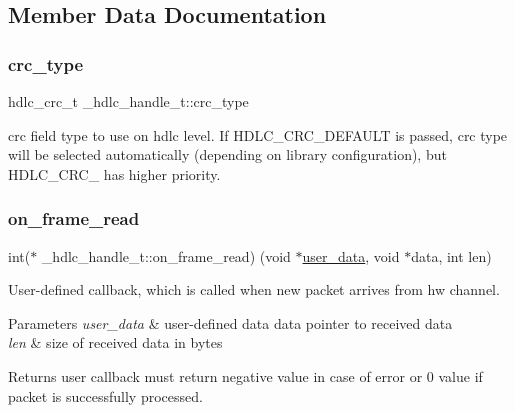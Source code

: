 \subsection{Member Data Documentation}
\mbox{\label{struct__hdlc__handle__t_a156f67a5da24e537a8c0dcda28b59668}} 
\subsubsection{\texorpdfstring{crc\+\_\+type}{crc\_type}}
{\footnotesize\ttfamily hdlc\+\_\+crc\+\_\+t \+\_\+hdlc\+\_\+handle\+\_\+t\+::crc\+\_\+type}

crc field type to use on hdlc level. If H\+D\+L\+C\+\_\+\+C\+R\+C\+\_\+\+D\+E\+F\+A\+U\+LT is passed, crc type will be selected automatically (depending on library configuration), but H\+D\+L\+C\+\_\+\+C\+R\+C\+\_ has higher priority. \mbox{\label{struct__hdlc__handle__t_a751872adfef39b5b1325fa8826bae689}} 
\subsubsection{\texorpdfstring{on\+\_\+frame\+\_\+read}{on\_frame\_read}}
{\footnotesize\ttfamily int($\ast$ \+\_\+hdlc\+\_\+handle\+\_\+t\+::on\+\_\+frame\+\_\+read) (void $\ast$\hyperlink{struct__hdlc__handle__t_a41563ee7b01240a582d2f9ce9a632da8}{user\+\_\+data}, void $\ast$data, int len)}

User-\/defined callback, which is called when new packet arrives from hw channel. 
\begin{DoxyParams}{Parameters}
{\em user\+\_\+data} & user-\/defined data  data pointer to received data \\
\hline
{\em len} & size of received data in bytes \\
\hline
\end{DoxyParams}
\begin{DoxyReturn}{Returns}
user callback must return negative value in case of error or 0 value if packet is successfully processed. 
\end{DoxyReturn}
\mbox{\label{struct__hdlc__handle__t_a4736ab7a858df79cf74bd19e6dbacb13}} 
